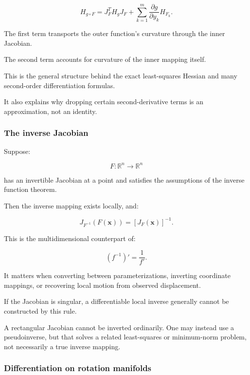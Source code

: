 \[
\boxed{ H_{g\circ F} = J_F^TH_gJ_F + \sum_{k=1}^{m} \frac{\partial g}{\partial y_k}H_{F_k} }.
\]

The first term transports the outer function's curvature through the inner Jacobian.

The second term accounts for curvature of the inner mapping itself.

This is the general structure behind the exact least-squares Hessian and many second-order differentiation formulas.

It also explains why dropping certain second-derivative terms is an approximation, not an identity.

\subsubsection{The inverse Jacobian}\label{02-foundations-ii-ch021-the-inverse-jacobian}

\hypertarget{02-foundations-ii-ch021-the-inverse-jacobian}{}

Suppose:

\[
F:\mathbb R^n\to\mathbb R^n
\]

has an invertible Jacobian at a point and satisfies the assumptions of the inverse function theorem.

Then the inverse mapping exists locally, and:

\[
\boxed{ J_{F^{-1}}(F(\mathbf x))= [J_F(\mathbf x)]^{-1} }.
\]

This is the multidimensional counterpart of:

\[
(f^{-1})'=\frac1{f'}.
\]

It matters when converting between parameterizations, inverting coordinate mappings, or recovering local motion from observed displacement.

If the Jacobian is singular, a differentiable local inverse generally cannot be constructed by this rule.

A rectangular Jacobian cannot be inverted ordinarily. One may instead use a pseudoinverse, but that solves a related least-squares or minimum-norm problem, not necessarily a true inverse mapping.

\subsubsection{Differentiation on rotation manifolds}\label{02-foundations-ii-ch021-differentiation-on-rotation-manifolds}

\hypertarget{02-foundations-ii-ch021-differentiation-on-rotation-manifolds}{}

